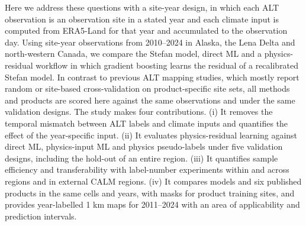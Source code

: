 Here we address these questions with a site-year design, in which each ALT observation is an observation site in a stated year and each climate input is computed from ERA5-Land for that year and accumulated to the observation day\cite{munozsabater2021_era5_land}. Using \nncyAll{} site-year observations from 2010--2024 in Alaska, the Lena Delta and north-western Canada, we compare the Stefan model, direct ML and a physics-residual workflow in which gradient boosting learns the residual of a recalibrated Stefan model. In contrast to previous ALT mapping studies, which mostly report random or site-based cross-validation on product-specific site sets\cite{Liu2024,Wei2026,Ran2022a}, all methods and products are scored here against the same observations and under the same validation designs. The study makes four contributions. (i) It removes the temporal mismatch between ALT labels and climate inputs and quantifies the effect of the year-specific input. (ii) It evaluates physics-residual learning against direct ML, physics-input ML and physics pseudo-labels under five validation designs, including the hold-out of an entire region. (iii) It quantifies sample efficiency and transferability with label-number experiments within and across regions and in external CALM regions. (iv) It compares models and six published products in the same cells and years, with masks for product training sites, and provides year-labelled 1 km maps for 2011--2024 with an area of applicability and prediction intervals.
